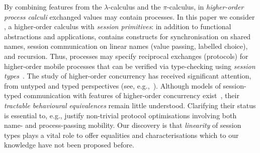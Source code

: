 \noindent
By combining features from the $\lambda$-calculus and the $\pi$-calculus, 
in \emph{higher-order process calculi} exchanged values may contain  processes. 
In this paper we consider \HOp, a higher-order calculus with \emph{session primitives}:
in addition to 
functional
abstractions and applications, \HOp 
contains constructs for 
synchronisation on shared names, 
  session communication on linear names (value passing, 
labelled choice), and recursion.
Thus, \HOp processes may specify reciprocal exchanges (protocols) 
for higher-order mobile processes that
 can be verified via type-checking using \emph{session types}~\cite{honda.vasconcelos.kubo:language-primitives}.
The study of higher-order concurrency has received significant attention, 
from untyped and typed perspectives (see, e.g.,~\cite{ThomsenB:plachoasgcfhop,SangiorgiD:expmpa,San96int,JeffreyR05,MostrousY15,DBLP:journals/iandc/LanesePSS11,DBLP:conf/icalp/LanesePSS10,DBLP:conf/esop/KoutavasH11,XuActa2012}).
Although models of session-typed 
communication with features of higher-order concurrency exist~\cite{tlca07,DBLP:journals/jfp/GayV10},
their  \emph{tractable behavioural equivalences} 
remain little understood. 
Clarifying their status is essential to, e.g., 
justify non-trivial protocol optimisations involving both name- and process-passing mobility.
Our discovery is that \emph{linearity} of session types plays a vital role to 
offer equalities and characterisations
which to our knowledge have not been proposed before.   

